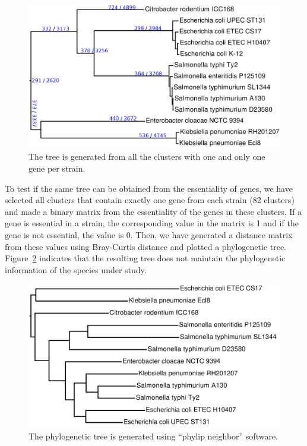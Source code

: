 \documentclass[a4paper,10pt, twocolumn]{article}
\begin{document}
\begin{figure}
\includegraphics[scale=0.14]{../speciestree/speciestree-annotated.png}
\caption{The tree is generated from all the clusters with one and only one gene per strain.}
\label{fig:species-tree}
\end{figure}

To test if the same tree can be obtained from the essentiality of genes, we have selected all clusters that contain exactly one gene from each strain (82 clusters) and made a binary matrix from the essentiality of the genes in these clusters. If a gene is essential in a strain, the corresponding value in the matrix is 1 and if the gene  is not essential, the value is 0. Then, we have generated a distance matrix from these values using Bray-Curtis distance and plotted a phylogenetic tree.  Figure~\ref{fig:essentiality-tree} indicates that the resulting tree does not maintain the phylogenetic information of the species under study.

\begin{figure}
\includegraphics[scale=0.14]{make-essentiality-tree/essentiality-tree.pdf}
\caption{The phylogenetic tree is generated using ``phylip neighbor'' software.}
\label{fig:essentiality-tree}
\end{figure}
\end{document}
